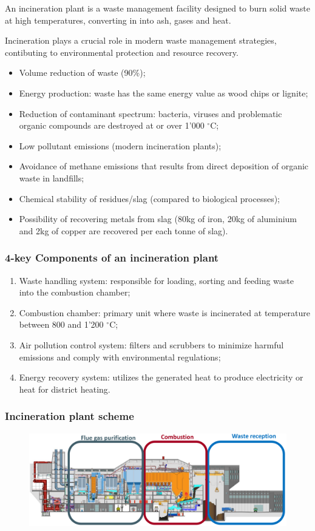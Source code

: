 \documentclass{article}
\newcommand{\cfig}[1]{%
  \begin{figure}[ht!]%
    \centering%
    #1%
  \end{figure}%
}
\begin{document}
An incineration plant is a waste management facility designed to burn solid waste at high temperatures,
converting in into ash, gases and heat.

Incineration plays a crucial role in modern waste management strategies, contibuting to
environmental protection and resource recovery.

\begin{itemize}
    \item Volume reduction of waste (90\%);
    \item Energy production: waste has the same energy value as wood chips or lignite;
    \item Reduction of contaminant spectrum: bacteria, viruses and problematic organic
        compounds are destroyed at or over 1'000 $^\circ$C;
    \item Low pollutant emissions (modern incineration plants);
    \item Avoidance of methane emissions that results from direct deposition of organic
        waste in landfills;
    \item Chemical stability of residues/slag (compared to biological processes);
    \item Possibility of recovering metals from slag (80kg of iron, 20kg of aluminium and 2kg of copper are recovered per each tonne of slag).
\end{itemize}

\subsubsection{4-key Components of an incineration plant}
\begin{enumerate}
    \item Waste handling system: responsible for loading, sorting and feeding waste into
        the combustion chamber;
    \item Combustion chamber: primary unit where waste is incinerated at temperature
        between 800 and 1'200 $^\circ$C;
    \item Air pollution control system: filters and scrubbers to minimize harmful emissions
        and comply with environmental regulations;
    \item Energy recovery system: utilizes the generated heat to produce electricity or heat
        for district heating.
\end{enumerate}

\newpage
\subsubsection{Incineration plant scheme}
\phantom{}
\cfig{\includegraphics*[width=.9\textwidth]{media/incineration-plant-scheme.png}}
\phantom{}
\end{document}
